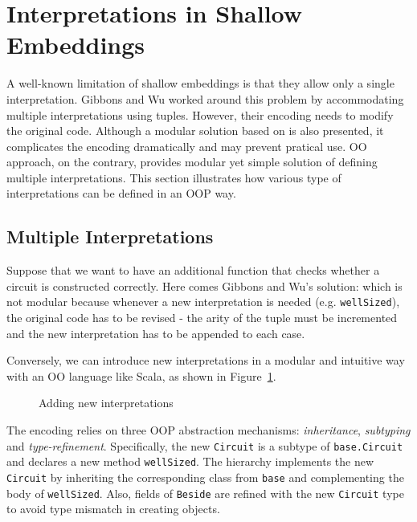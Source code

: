 \section{Interpretations in Shallow Embeddings}

A well-known limitation of shallow embeddings is that they allow only a single
interpretation. Gibbons and Wu worked around this problem by accommodating
multiple interpretations using tuples. However, their encoding needs to modify
the original code. Although a modular solution based on \cite{swierstra2008data}
is also presented, it complicates the encoding dramatically and may prevent pratical use.
OO approach, on the contrary, provides modular yet simple solution of defining
multiple interpretations. This section illustrates how various type of
interpretations can be defined in an OOP way.


\subsection{Multiple Interpretations}
Suppose that we want to have an additional function that checks whether a circuit is
constructed correctly. Here comes Gibbons and Wu's solution:
which is not modular because
whenever a new interpretation is needed (e.g. \lstinline{wellSized}), the
original code has to be revised -
the arity of the tuple must be incremented and the new interpretation has to be
appended to each case.

Conversely, we can introduce new interpretations in a
modular and intuitive way with an OO language like Scala, as shown in Figure~\ref{code:operation}.
\begin{figure}
\caption{Adding new interpretations}
\label{code:operation}
\end{figure}
The encoding relies on three OOP abstraction mechanisms:
\emph{inheritance}, \emph{subtyping} and \emph{type-refinement}.
Specifically, the new \lstinline{Circuit} is a subtype of
\lstinline{base.Circuit} and declares a new method \lstinline{wellSized}.
The hierarchy implements the new \lstinline{Circuit} by inheriting the corresponding class
from \lstinline{base} and
complementing the body of \lstinline{wellSized}.
Also, fields of \lstinline{Beside} are refined with the new \lstinline{Circuit} type
to avoid type mismatch in creating objects.

